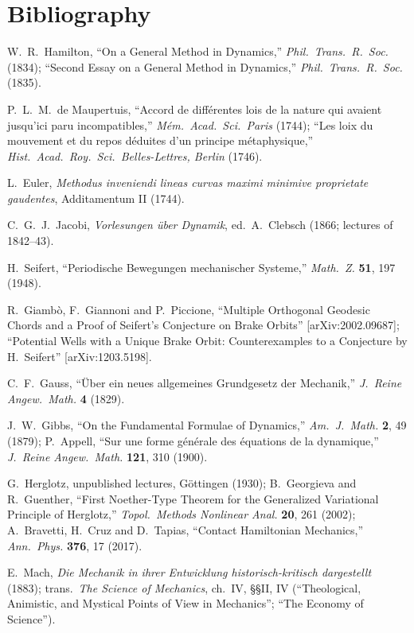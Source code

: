 \documentclass[11pt]{book}
\theoremstyle{definition}
\theoremstyle{plain}
\theoremstyle{remark}
\begin{document}
\section*{Bibliography}
\begin{enumerate}[label={[\arabic*]}, itemsep=1pt]
\item W.~R.~Hamilton, ``On a General Method in Dynamics,'' \emph{Phil.\ Trans.\ R.\ Soc.} (1834); ``Second Essay on a General Method in Dynamics,'' \emph{Phil.\ Trans.\ R.\ Soc.} (1835).
\item P.~L.~M.~de Maupertuis, ``Accord de différentes lois de la nature qui avaient jusqu'ici paru incompatibles,'' \emph{Mém.\ Acad.\ Sci.\ Paris} (1744); ``Les loix du mouvement et du repos déduites d'un principe métaphysique,'' \emph{Hist.\ Acad.\ Roy.\ Sci.\ Belles-Lettres, Berlin} (1746).
\item L.~Euler, \emph{Methodus inveniendi lineas curvas maximi minimive proprietate gaudentes}, Additamentum II (1744).
\item C.~G.~J.~Jacobi, \emph{Vorlesungen über Dynamik}, ed.\ A.~Clebsch (1866; lectures of 1842--43).
\item H.~Seifert, ``Periodische Bewegungen mechanischer Systeme,'' \emph{Math.\ Z.} \textbf{51}, 197 (1948).
\item R.~Giambò, F.~Giannoni and P.~Piccione, ``Multiple Orthogonal Geodesic Chords and a Proof of Seifert's Conjecture on Brake Orbits'' [arXiv:2002.09687]; ``Potential Wells with a Unique Brake Orbit: Counterexamples to a Conjecture by H.~Seifert'' [arXiv:1203.5198].
\item C.~F.~Gauss, ``Über ein neues allgemeines Grundgesetz der Mechanik,'' \emph{J.\ Reine Angew.\ Math.} \textbf{4} (1829).
\item J.~W.~Gibbs, ``On the Fundamental Formulae of Dynamics,'' \emph{Am.\ J.\ Math.} \textbf{2}, 49 (1879); P.~Appell, ``Sur une forme générale des équations de la dynamique,'' \emph{J.\ Reine Angew.\ Math.} \textbf{121}, 310 (1900).
\item G.~Herglotz, unpublished lectures, Göttingen (1930); B.~Georgieva and R.~Guenther, ``First Noether-Type Theorem for the Generalized Variational Principle of Herglotz,'' \emph{Topol.\ Methods Nonlinear Anal.} \textbf{20}, 261 (2002); A.~Bravetti, H.~Cruz and D.~Tapias, ``Contact Hamiltonian Mechanics,'' \emph{Ann.\ Phys.} \textbf{376}, 17 (2017).
\item E.~Mach, \emph{Die Mechanik in ihrer Entwicklung historisch-kritisch dargestellt} (1883); trans.\ \emph{The Science of Mechanics}, ch.~IV, \S\S II, IV (``Theological, Animistic, and Mystical Points of View in Mechanics''; ``The Economy of Science'').

\end{enumerate}
\end{document}
